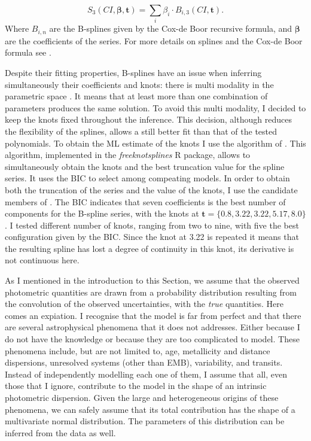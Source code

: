 \begin{equation}
S_3(CI,\boldsymbol{\beta},\mathbf{t}) = \sum_i \beta_i\cdot B_{i,3}(CI,\mathbf{t}).
\end{equation}
Where $B_{i,n}$ are the B-splines given by the Cox-de Boor recursive formula, and $\boldsymbol{\beta}$ are the coefficients of the series. For more details on splines and the Cox-de Boor formula see \citet{deBoor1978}.



Despite their fitting properties, B-splines have an issue when inferring simultaneously their coefficients and knots: there is multi modality in the parametric space \citep{Lindstrom1999}. It means that at least more than one combination of parameters produces the same solution. To avoid this multi modality, I decided to keep the knots fixed throughout the inference. This decision, although reduces the flexibility of the splines, allows a still better fit than that of the tested polynomials. To obtain the ML estimate of the knots I use the algorithm of  \citet{Spiriti2013}. This algorithm, implemented in the \emph{freeknotsplines} R package, allows to simultaneously obtain the knots and the best truncation value for the spline series. It uses the BIC to select among compeating models. In order to obtain both the truncation of the series and the value of the knots, I use the candidate members of \citet{Bouy2015}. The BIC indicates that seven coefficients is the best number of components for the B-spline series, with the knots at $\mathbf{t}=\{0.8,3.22,3.22,5.17,8.0\}$. I tested different number of knots, ranging from two to nine, with five the best configuration given by the BIC. Since the knot at 3.22 is repeated it means that the resulting spline has lost a degree of continuity in this knot, its derivative is not continuous here.

As I mentioned in the introduction to this Section, we assume that the observed photometric quantities are drawn from a probability distribution resulting from the convolution of the observed uncertainties, with the \emph{true} quantities. Here comes an expiation. I recognise that the model is far from perfect and that there are several astrophysical phenomena that it does not addresses. Either because I do not have the knowledge or because they are too complicated to model. These phenomena include, but are not limited to, age, metallicity and distance dispersions, unresolved systems (other than EMB), variability, and transits. Instead of independently modelling each one of them, I assume that all, even those that I ignore, contribute to the model in the shape of an intrinsic photometric dispersion. Given the large and heterogeneous origins of these phenomena, we can safely assume that its total contribution has the shape of a multivariate normal distribution. The parameters of this distribution can be inferred from the data as well.

